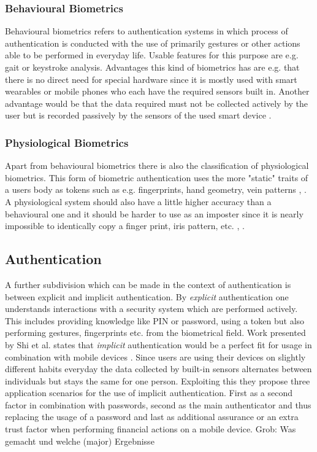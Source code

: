 \subsubsection{Behavioural Biometrics} Behavioural biometrics refers to authentication systems in which process of authentication is conducted with the use of primarily gestures or other actions able to be performed in everyday life. Usable features for this purpose are e.g. gait or keystroke analysis. Advantages this kind of biometrics has are e.g. that there is no direct need for special hardware since it is mostly used with smart wearables or mobile phones who each have the required sensors built in. Another advantage would be that the data required must not be collected actively by the user but is recorded passively by the sensors of the used smart device \cite{yampolskiy2008behavioural}.
\subsubsection{Physiological Biometrics} Apart from behavioural biometrics there is also the classification of physiological biometrics. This form of biometric authentication uses the more "static" traits of a users body as tokens such as e.g. fingerprints, hand geometry, vein patterns \cite{alsaadi2015physiological}, \cite{faltaous2019vpid}. A physiological system should also have a little higher accuracy than a behavioural one and it should be harder to use as an imposter since it is nearly impossible to identically copy a finger print, iris pattern, etc. \cite{koong2014user}, \cite{delac2004survey}.

\subsection{Authentication} 
A further subdivision which can be made in the context of authentication is between explicit and implicit authentication. By \textit{explicit}  authentication one understands interactions with a security system which are performed actively. This includes providing knowledge like PIN or password, using a token but also performing gestures, fingerprints etc. from the biometrical field.\newline 
Work presented by Shi et al. states that \textit{implicit} authentication would be a perfect fit for usage in combination with mobile devices \cite{shi2010implicit}. Since users are using their devices on slightly different habits everyday the data collected by built-in sensors alternates between individuals but stays the same for one person. Exploiting this they propose three application scenarios for the use of implicit authentication.\newline
First as a second factor in combination with passwords, second as the main authenticator and thus replacing the usage of a password and last as additional assurance or an extra trust factor when performing financial actions on a mobile device.
\newline \newline
Grob: Was gemacht und welche (major) Ergebnisse

